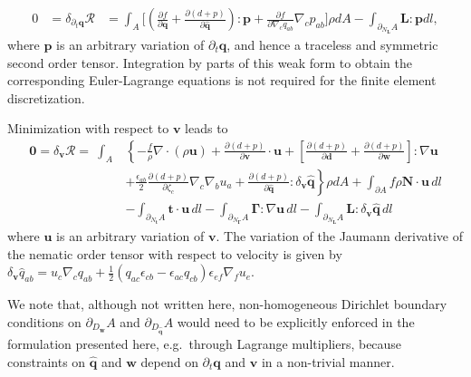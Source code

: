 \documentclass[12pt]{iopart}
\begin{document}
	\begin{eqnarray}
		0&=\delta_{\partial_t \bm{q}} \mathcal{R} 
		&=  \int_A  \bigg[ \left(\frac{\partial  f}{\partial \bm{q}} +   \frac{\partial (d+p)}{\partial \widehat{\bm{q}}}  \right):\bm{p} + \frac{\partial f}{\partial \nabla_c {q}_{ab}}  \nabla_c  {p}_{ab} \bigg]\rho dA -   \int_{\partial_{N_{\bm{L}}}A} \bm{L}:\bm{p} dl, \label{eq:weak_q_disc}
	\end{eqnarray}
	where $\bm{p}$ is an arbitrary variation of $\partial_t \bm{q}$, and hence a traceless and symmetric second order tensor. Integration by parts of this weak form to obtain the corresponding Euler-Lagrange equations is not required for the finite element discretization. 
	
	Minimization with respect to $\bm{v}$ leads to
	\begin{eqnarray}
		\bm{0}=\delta_{\bm{v}} \mathcal{R}=   ~\int_A &\left\{-\frac{ f}{\rho} \nabla \cdot \left(\rho\bm{u}\right) + \frac{\partial ( d+ p)}{\partial \bm{v}} \cdot\bm{u}    \right.  
		+ \left[\frac{\partial ( d+ p)}{\partial \bm{d}} + \frac{\partial ( d+ p)}{\partial \bm{w}}\right] : \nabla\bm{u}\nonumber\\
		&+ \left. \frac{\epsilon_{ab}}{2} \frac{\partial ( d+ p)}{\partial {\zeta}_c} \nabla_c \nabla_b {u}_a + \frac{\partial ( d+ p)}{\partial \widehat{\bm{q}}} : \delta_{\bm{v}} \widehat{\bm{q}} \right\} \rho dA 
		+   \int_{\partial A} f\rho \bm{N}\cdot\bm{u}\,dl	
		\nonumber\\
		& - \int_{\partial_{N_{\bm{t}}} A} \bm{t} \cdot \bm{u} \,dl -  \int_{\partial_{N_{\bm{\Gamma}}} A} \bm{\Gamma}:\nabla\bm{u} \,dl -  \int_{\partial_{N_{\bm{L}}} A} \bm{L}:\delta_{\bm{v}} \widehat{\bm{q}} \,dl
		\label{eq:weak_v_disc}
	\end{eqnarray}  
	where $\bm{u}$ is an arbitrary variation of $\bm{v}$. The variation of the Jaumann derivative of the nematic order tensor with respect to velocity is given by $\delta_{\bm{v}} \widehat{{q}}_{ab}=  {u}_c\nabla_c{q}_{ab} + \frac{1}{2}\left({q}_{ac} {\epsilon}_{cb} -{\epsilon}_{ac}{q}_{cb} \right) {\epsilon}_{ef}\nabla_f{u}_e$. 
	
We note that, although not written here, non-homogeneous Dirichlet boundary conditions on $\partial_{D_{\bm{w}}} A $ and $\partial_{D_{\widehat{\bm{q}}}} A $ would need to be explicitly enforced in the formulation presented here, e.g.~through Lagrange multipliers, because constraints on $\widehat{\bm{q}}$ and $\bm{w}$ depend on  $\partial_t \bm{q}$ and $\bm{v}$ in a non-trivial manner. 
	
\end{document}
